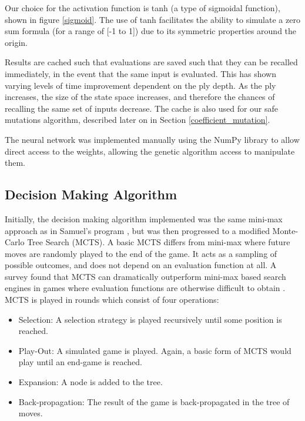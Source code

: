 \documentclass[12pt,a4paper]{article}
\begin{document}
        Our choice for the activation function is tanh (a type of sigmoidal function), shown in figure \ref{sigmoid}. 
        The use of tanh facilitates the ability to simulate a zero sum formula (for a range of [-1 to 1]) due to its symmetric properties around the origin.
        
        Results are cached such that evaluations are saved such that they can be recalled immediately, in the event that the same input is evaluated. This has shown varying levels of time improvement dependent on the ply depth. As the ply increases, the size of the state space increases, and therefore the chances of recalling the same set of inputs decrease. The cache is also used for our safe mutations algorithm, described later on in Section \ref{coefficient_mutation}.

        The neural network was implemented manually using the NumPy library to allow direct access to the weights, allowing the genetic algorithm access to manipulate them.
    
    \subsection{Decision Making Algorithm}
        Initially, the decision making algorithm implemented was the same mini-max approach as in Samuel's program \cite{samuel_studies_1959}, but was then progressed to a modified Monte-Carlo Tree Search (MCTS). A basic MCTS differs from mini-max where future moves are randomly played to the end of the game. It acts as a sampling of possible outcomes, and does not depend on an evaluation function at all. A survey found that MCTS can dramatically outperform mini-max based search engines in games where evaluation functions are otherwise difficult to obtain \cite{browne_survey_2012}. MCTS is played in rounds which consist of four operations:

        \begin{itemize}
            \item Selection: A selection strategy is played recursively until some position is reached. 
            \item Play-Out: A simulated game is played. Again, a basic form of MCTS would play until an end-game is reached.
            \item Expansion: A node is added to the tree.
            \item Back-propagation: The result of the game is back-propagated in the tree of moves.
        \end{itemize}
\end{document}
